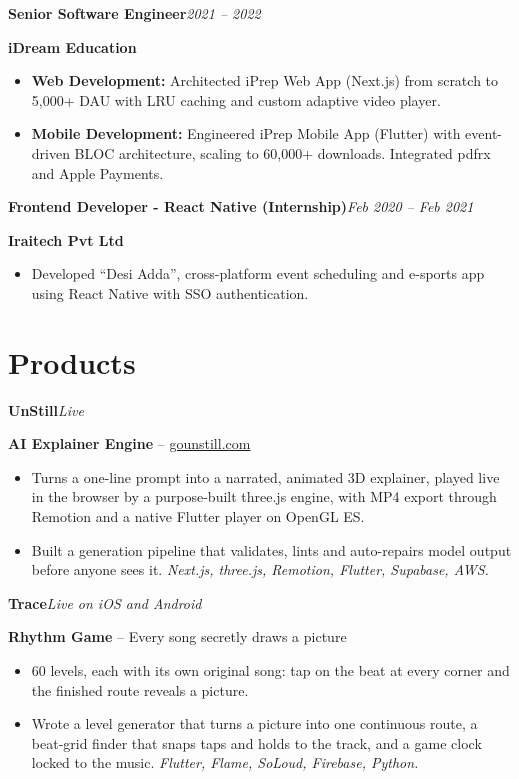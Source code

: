 \documentclass[10pt,a4paper]{article}
\newcommand{\lk}[2]{\href{#1}{\color{link}#2}}
\newcommand{\role}[2]{\needspace{4\baselineskip}\textbf{\color{navy}#1}\hfill\textit{#2}\par}
\newcommand{\org}[2]{\textbf{#1}#2\par}
\newcommand{\gap}{\vspace{6.5pt}}
\renewcommand{\b}[1]{\textbf{#1}}
\newcommand{\stack}[1]{\textit{#1}}
\begin{document}
\role{Senior Software Engineer}{2021 – 2022}
\org{iDream Education}{}
\begin{itemize}
\item \b{Web Development:} Architected iPrep Web App (Next.js) from scratch to 5,000+ DAU with LRU caching and custom adaptive video player.
\item \b{Mobile Development:} Engineered iPrep Mobile App (Flutter) with event-driven BLOC architecture, scaling to 60,000+ downloads. Integrated pdfrx and Apple Payments.
\end{itemize}
\gap

\role{Frontend Developer - React Native (Internship)}{Feb 2020 – Feb 2021}
\org{Iraitech Pvt Ltd}{}
\begin{itemize}
\item Developed ``Desi Adda'', cross-platform event scheduling and e-sports app using React Native with SSO authentication.
\end{itemize}

\newpage
\section{Products}
\role{UnStill}{Live}
\org{AI Explainer Engine}{ – \lk{https://gounstill.com}{gounstill.com}}
\begin{itemize}
\item Turns a one-line prompt into a narrated, animated 3D explainer, played live in the browser by a purpose-built three.js engine, with MP4 export through Remotion and a native Flutter player on OpenGL ES.
\item Built a generation pipeline that validates, lints and auto-repairs model output before anyone sees it. \stack{Next.js, three.js, Remotion, Flutter, Supabase, AWS.}
\end{itemize}
\gap

\role{Trace}{Live on iOS and Android}
\org{Rhythm Game}{ – Every song secretly draws a picture}
\begin{itemize}
\item 60 levels, each with its own original song: tap on the beat at every corner and the finished route reveals a picture.
\item Wrote a level generator that turns a picture into one continuous route, a beat-grid finder that snaps taps and holds to the track, and a game clock locked to the music. \stack{Flutter, Flame, SoLoud, Firebase, Python.}
\end{itemize}
\gap
\end{document}

